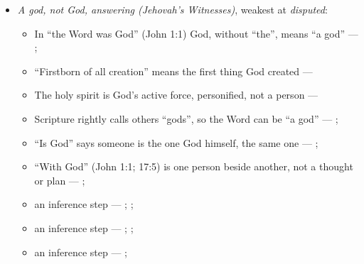 \documentclass[11pt,paper=\testimonypaper,DIV=13,parskip=false]{scrartcl}
\begin{document}
\begin{itemize}
\begin{itemize}
\item an inference step --- \cite[23--24]{sharp-remarks-definitive-article-1803}; \cite[79]{metzger-jehovahs-witnesses-jesus-christ-1953}; \cite{new-world-translation-2013}
\item an inference step --- \cite[on Romans 9:5]{calvin-romans-1849}; \cite{new-world-translation-2013}
\item an inference step --- \cite[on Philippians 2:9–10]{calvin-commentaries-philippians}; \cite[on Romans 14:11]{calvin-romans-1849}; \cite{new-world-translation-2013}
\end{itemize}
\item \emph{A god, not God, answering (Jehovah’s Witnesses)}, weakest at \emph{disputed}:
\begin{itemize}
\item In “the Word was God” (John 1:1) God, without “the”, means “a god” --- \cite[27]{watchtower-should-you-believe-trinity-1989}; \cite{new-world-translation-2013}
\item “Firstborn of all creation” means the first thing God created --- \cite[14]{watchtower-should-you-believe-trinity-1989}
\item The holy spirit is God’s active force, personified, not a person --- \cite[20--23]{watchtower-should-you-believe-trinity-1989}
\item Scripture rightly calls others “gods”, so the Word can be “a god” --- \cite[28]{watchtower-should-you-believe-trinity-1989}; \cite[31]{watchtower-questions-from-readers-1986}
\item “Is God” says someone is the one God himself, the same one --- \cite[ch. 8, Are Jesus and the Father One in Purpose Only?]{bernard-oneness-of-god-1983}; \cite[27]{watchtower-should-you-believe-trinity-1989}
\item “With God” (John 1:1; 17:5) is one person beside another, not a thought or plan --- \cite[3, The Triune God]{kibbey-living-systematic-theology-2026}; \cite[27]{watchtower-should-you-believe-trinity-1989}
\item an inference step --- \cite[28]{watchtower-should-you-believe-trinity-1989}; \cite[31]{watchtower-questions-from-readers-1986}; \cite[Origen, Against Celsus V.39]{roberts-ante-nicene-fathers-4-1885}
\item an inference step --- \cite[ch. 8, Are Jesus and the Father One in Purpose Only?]{bernard-oneness-of-god-1983}; \cite[27]{watchtower-should-you-believe-trinity-1989}; \cite[I, q. 28, a. 3]{aquinas-summa-1920}
\item an inference step --- \cite[23]{watchtower-should-you-believe-trinity-1989}; \cite[122--123]{roberts-christendom-astray}

\end{itemize}
\end{itemize}
\end{document}
